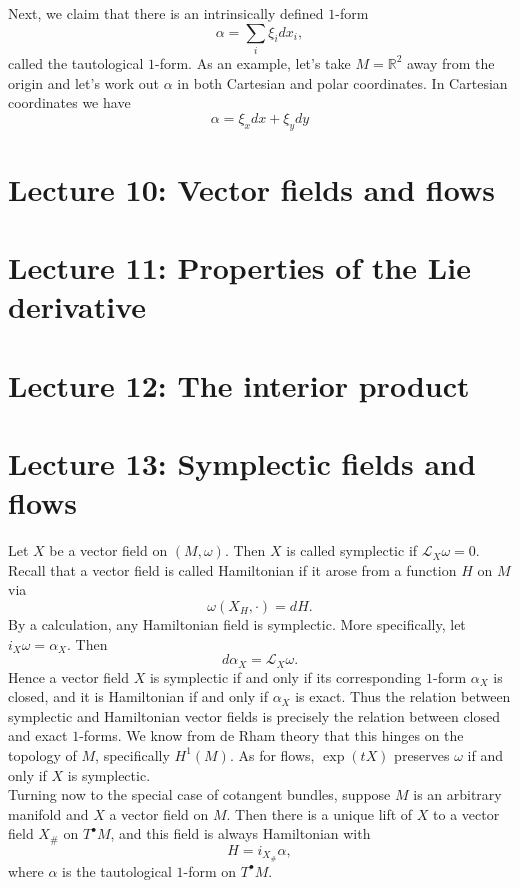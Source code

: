 \documentclass[11pt]{article} %
\begin{document}
Next, we claim that there is an intrinsically defined $1$-form
$$
\alpha = \sum_i \xi_i dx_i,
$$
called the tautological $1$-form. As an example, let's take $M=\mathbb{R}^2$ away from the origin and let's work out $\alpha$ in both Cartesian and polar coordinates. In Cartesian coordinates we have
$$
\alpha = \xi_x dx + \xi_y dy
$$



\section*{Lecture 10: Vector fields and flows}

\section*{Lecture 11: Properties of the Lie derivative}

\section*{Lecture 12: The interior product}


\section*{Lecture 13: Symplectic fields and flows}
Let $X$ be a vector field on $(M,\omega)$. Then $X$ is called symplectic if $\mathscr{L}_X \omega = 0$. Recall that a vector field is called Hamiltonian if it arose from a function $H$ on $M$ via
$$
\omega (X_H, \cdot) = dH.
$$
By a calculation, any Hamiltonian field is symplectic. More specifically, let $i_X\omega = \alpha_X$. Then
$$
d\alpha_X = \mathscr{L}_X \omega.
$$
Hence a vector field $X$ is symplectic if and only if its corresponding $1$-form $\alpha_X$ is closed, and it is Hamiltonian if and only if $\alpha_X$ is exact. Thus the relation between symplectic and Hamiltonian vector fields is precisely the relation between closed and exact $1$-forms. We know from de Rham theory that this hinges on the topology of $M$, specifically $H^1(M)$. As for flows, $\operatorname{exp}(tX)$ preserves $\omega$ if and only if $X$ is symplectic. \\
Turning now to the special case of cotangent bundles, suppose $M$ is an arbitrary manifold and $X$ a vector field on $M$. Then there is a unique lift of $X$ to a vector field $X_\#$ on $T^\bullet M$, and this field is always Hamiltonian with 
$$
H = i_{X_\#}\alpha,
$$
where $\alpha$ is the tautological $1$-form on $T^\bullet M$.
\end{document}
